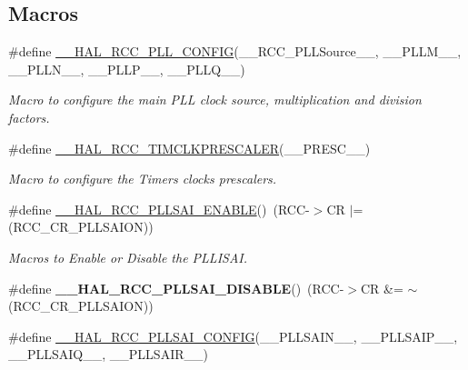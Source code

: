 \subsection*{Macros}
\begin{DoxyCompactItemize}
\item 
\#define \mbox{\hyperlink{group___r_c_c_ex___exported___macros_ga56d9ad48b28e7aa4ad3aadca5b4fd431}{\+\_\+\+\_\+\+H\+A\+L\+\_\+\+R\+C\+C\+\_\+\+P\+L\+L\+\_\+\+C\+O\+N\+F\+IG}}(\+\_\+\+\_\+\+R\+C\+C\+\_\+\+P\+L\+L\+Source\+\_\+\+\_\+,  \+\_\+\+\_\+\+P\+L\+L\+M\+\_\+\+\_\+,  \+\_\+\+\_\+\+P\+L\+L\+N\+\_\+\+\_\+,  \+\_\+\+\_\+\+P\+L\+L\+P\+\_\+\+\_\+,  \+\_\+\+\_\+\+P\+L\+L\+Q\+\_\+\+\_\+)
\begin{DoxyCompactList}\small\item\em Macro to configure the main P\+LL clock source, multiplication and division factors. \end{DoxyCompactList}\item 
\#define \mbox{\hyperlink{group___r_c_c_ex___exported___macros_ga292ca7c84f192778314125ed6d7c8333}{\+\_\+\+\_\+\+H\+A\+L\+\_\+\+R\+C\+C\+\_\+\+T\+I\+M\+C\+L\+K\+P\+R\+E\+S\+C\+A\+L\+ER}}(\+\_\+\+\_\+\+P\+R\+E\+S\+C\+\_\+\+\_\+)
\begin{DoxyCompactList}\small\item\em Macro to configure the Timers clocks prescalers. \end{DoxyCompactList}\item 
\#define \mbox{\hyperlink{group___r_c_c_ex___exported___macros_ga829deb86fa0bf2b9303599f25143bb83}{\+\_\+\+\_\+\+H\+A\+L\+\_\+\+R\+C\+C\+\_\+\+P\+L\+L\+S\+A\+I\+\_\+\+E\+N\+A\+B\+LE}}()~(R\+CC-\/$>$CR $\vert$= (R\+C\+C\+\_\+\+C\+R\+\_\+\+P\+L\+L\+S\+A\+I\+ON))
\begin{DoxyCompactList}\small\item\em Macros to Enable or Disable the P\+L\+L\+I\+S\+AI. \end{DoxyCompactList}\item 
\mbox{\label{group___r_c_c_ex___exported___macros_ga8ec70b1740682f5145ac93c17eb87ce8}} 
\#define {\bfseries \+\_\+\+\_\+\+H\+A\+L\+\_\+\+R\+C\+C\+\_\+\+P\+L\+L\+S\+A\+I\+\_\+\+D\+I\+S\+A\+B\+LE}()~(R\+CC-\/$>$CR \&= $\sim$(R\+C\+C\+\_\+\+C\+R\+\_\+\+P\+L\+L\+S\+A\+I\+ON))
\item 
\#define \mbox{\hyperlink{group___r_c_c_ex___exported___macros_gaceef24f97e3781b61c14681fb7cc7346}{\+\_\+\+\_\+\+H\+A\+L\+\_\+\+R\+C\+C\+\_\+\+P\+L\+L\+S\+A\+I\+\_\+\+C\+O\+N\+F\+IG}}(\+\_\+\+\_\+\+P\+L\+L\+S\+A\+I\+N\+\_\+\+\_\+,  \+\_\+\+\_\+\+P\+L\+L\+S\+A\+I\+P\+\_\+\+\_\+,  \+\_\+\+\_\+\+P\+L\+L\+S\+A\+I\+Q\+\_\+\+\_\+,  \+\_\+\+\_\+\+P\+L\+L\+S\+A\+I\+R\+\_\+\+\_\+)

\end{DoxyCompactItemize}
